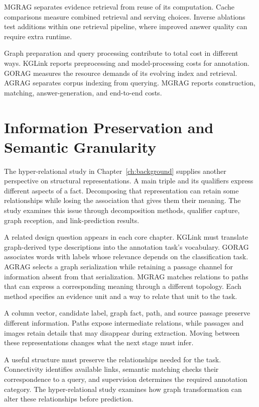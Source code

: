 MGRAG separates evidence retrieval from reuse of its computation. Cache comparisons measure combined retrieval and serving choices. Inverse ablations test additions within one retrieval pipeline, where improved answer quality can require extra runtime.

Graph preparation and query processing contribute to total cost in different ways. KGLink reports preprocessing and model-processing costs for annotation. GORAG measures the resource demands of its evolving index and retrieval. AGRAG separates corpus indexing from querying. MGRAG reports construction, matching, answer-generation, and end-to-end costs.

\section{Information Preservation and Semantic Granularity}
\label{sec:discussion:preservation}
The hyper-relational study in Chapter~\ref{ch:background} supplies another perspective on structural representations. A main triple and its qualifiers express different aspects of a fact. Decomposing that representation can retain some relationships while losing the association that gives them their meaning. The study examines this issue through decomposition methods, qualifier capture, graph reception, and link-prediction results.

A related design question appears in each core chapter. KGLink must translate graph-derived type descriptions into the annotation task's vocabulary. GORAG associates words with labels whose relevance depends on the classification task. AGRAG selects a graph serialization while retaining a passage channel for information absent from that serialization. MGRAG matches relations to paths that can express a corresponding meaning through a different topology. Each method specifies an evidence unit and a way to relate that unit to the task.

A column vector, candidate label, graph fact, path, and source passage preserve different information. Paths expose intermediate relations, while passages and images retain details that may disappear during extraction. Moving between these representations changes what the next stage must infer.

A useful structure must preserve the relationships needed for the task. Connectivity identifies available links, semantic matching checks their correspondence to a query, and supervision determines the required annotation category. The hyper-relational study examines how graph transformation can alter these relationships before prediction.

